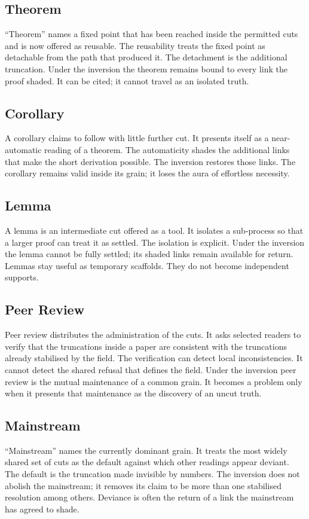 \documentclass[11pt,a4paper]{article}
\begin{document}
\subsection{Theorem} ``Theorem'' names a fixed point that has been reached inside the permitted cuts and is now offered as reusable. The reusability treats the fixed point as detachable from the path that produced it. The detachment is the additional truncation. Under the inversion the theorem remains bound to every link the proof shaded. It can be cited; it cannot travel as an isolated truth.

\subsection{Corollary} A corollary claims to follow with little further cut. It presents itself as a near-automatic reading of a theorem. The automaticity shades the additional links that make the short derivation possible. The inversion restores those links. The corollary remains valid inside its grain; it loses the aura of effortless necessity.

\subsection{Lemma} A lemma is an intermediate cut offered as a tool. It isolates a sub-process so that a larger proof can treat it as settled. The isolation is explicit. Under the inversion the lemma cannot be fully settled; its shaded links remain available for return. Lemmas stay useful as temporary scaffolds. They do not become independent supports.

\subsection{Peer Review} Peer review distributes the administration of the cuts. It asks selected readers to verify that the truncations inside a paper are consistent with the truncations already stabilised by the field. The verification can detect local inconsistencies. It cannot detect the shared refusal that defines the field. Under the inversion peer review is the mutual maintenance of a common grain. It becomes a problem only when it presents that maintenance as the discovery of an uncut truth.

\subsection{Mainstream} ``Mainstream'' names the currently dominant grain. It treats the most widely shared set of cuts as the default against which other readings appear deviant. The default is the truncation made invisible by numbers. The inversion does not abolish the mainstream; it removes its claim to be more than one stabilised resolution among others. Deviance is often the return of a link the mainstream has agreed to shade.
\end{document}
